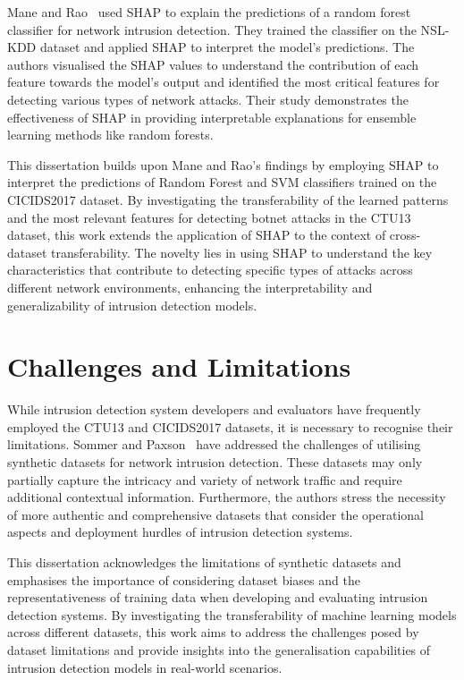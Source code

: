 Mane and Rao~\cite{mane2021explaining} used SHAP to explain the predictions of a random forest classifier for network intrusion detection. They trained the classifier on the NSL-KDD dataset and applied SHAP to interpret the model’s predictions. The authors visualised the SHAP values to understand the contribution of each feature towards the model’s output and identified the most critical features for detecting various types of network attacks. Their study demonstrates the effectiveness of SHAP in providing interpretable explanations for ensemble learning methods like random forests.

This dissertation builds upon Mane and Rao’s findings by employing SHAP to interpret the predictions of Random Forest and SVM classifiers trained on the CICIDS2017 dataset. By investigating the transferability of the learned patterns and the most relevant features for detecting botnet attacks in the CTU13 dataset, this work extends the application of SHAP to the context of cross-dataset transferability. The novelty lies in using SHAP to understand the key characteristics that contribute to detecting specific types of attacks across different network environments, enhancing the interpretability and generalizability of intrusion detection models.

\section{Challenges and Limitations}

While intrusion detection system developers and evaluators have frequently employed the CTU13 and CICIDS2017 datasets, it is necessary to recognise their limitations. Sommer and Paxson~\cite{sommer2010outside} have addressed the challenges of utilising synthetic datasets for network intrusion detection. These datasets may only partially capture the intricacy and variety of network traffic and require additional contextual information. Furthermore, the authors stress the necessity of more authentic and comprehensive datasets that consider the operational aspects and deployment hurdles of intrusion detection systems.

This dissertation acknowledges the limitations of synthetic datasets and emphasises the importance of considering dataset biases and the representativeness of training data when developing and evaluating intrusion detection systems. By investigating the transferability of machine learning models across different datasets, this work aims to address the challenges posed by dataset limitations and provide insights into the generalisation capabilities of intrusion detection models in real-world scenarios.

